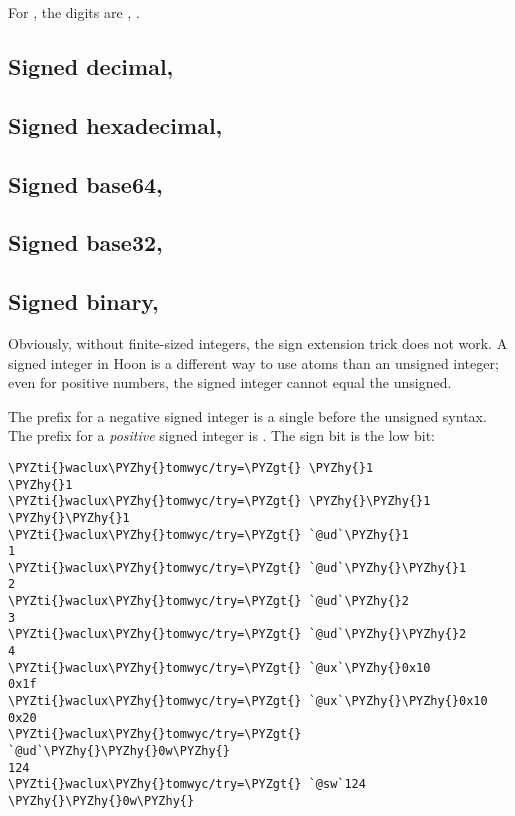 For , the digits are , .

\subsection{Signed decimal, }

\subsection{Signed hexadecimal, }

\subsection{Signed base64, }

\subsection{Signed base32, }

\subsection{Signed binary, }

Obviously, without finite-sized integers, the sign extension
trick does not work.  A signed integer in Hoon is a different way
to use atoms than an unsigned integer; even for positive numbers,
the signed integer cannot equal the unsigned.

The prefix for a negative signed integer is a single \kode{-} before
the unsigned syntax.  The prefix for a \emph{positive} signed integer
is \kode{--}.  The sign bit is the low bit:

\begin{framed_shaded}
\begin{Verbatim}[fontsize=\relsize{-2.5},fontseries=b,commandchars=\\\{\}]
\PYZti{}waclux\PYZhy{}tomwyc/try=\PYZgt{} \PYZhy{}1
\PYZhy{}1
\PYZti{}waclux\PYZhy{}tomwyc/try=\PYZgt{} \PYZhy{}\PYZhy{}1
\PYZhy{}\PYZhy{}1
\PYZti{}waclux\PYZhy{}tomwyc/try=\PYZgt{} `@ud`\PYZhy{}1
1
\PYZti{}waclux\PYZhy{}tomwyc/try=\PYZgt{} `@ud`\PYZhy{}\PYZhy{}1
2
\PYZti{}waclux\PYZhy{}tomwyc/try=\PYZgt{} `@ud`\PYZhy{}2
3
\PYZti{}waclux\PYZhy{}tomwyc/try=\PYZgt{} `@ud`\PYZhy{}\PYZhy{}2
4
\PYZti{}waclux\PYZhy{}tomwyc/try=\PYZgt{} `@ux`\PYZhy{}0x10
0x1f
\PYZti{}waclux\PYZhy{}tomwyc/try=\PYZgt{} `@ux`\PYZhy{}\PYZhy{}0x10
0x20
\PYZti{}waclux\PYZhy{}tomwyc/try=\PYZgt{} `@ud`\PYZhy{}\PYZhy{}0w\PYZhy{}
124
\PYZti{}waclux\PYZhy{}tomwyc/try=\PYZgt{} `@sw`124
\PYZhy{}\PYZhy{}0w\PYZhy{}
\end{Verbatim}
\end{framed_shaded}


